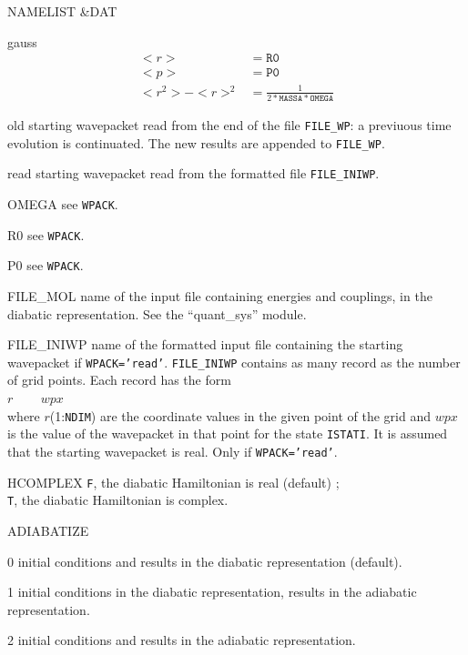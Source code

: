 \documentclass[12pt,fleqn]{article}
\begin{document}
\begin{labeling}{NAMELIST \&DAT}
\begin{labeling}{gauss}
\begin{align*}
                           <r> &= \mathtt{R0}   \\
                           <p> &= \mathtt{P0}   \\
                           <r^2> - <r>^2 &= \frac{1}{2 * \mathtt{MASSA} * \mathtt{OMEGA}}
                         \end{align*}
                       \item[old]  starting wavepacket read from the end of the file \texttt{FILE\_WP}: a previuous time
                         evolution is continuated. The new results are appended to \texttt{FILE\_WP}.
                       \item[read]  starting wavepacket read from the formatted file \texttt{FILE\_INIWP}.
                     \end{labeling}
  \item[OMEGA] see \texttt{WPACK}.
  \item[R0] see \texttt{WPACK}.
  \item[P0] see \texttt{WPACK}.
  \item[FILE\_MOL] name of the input file containing energies and couplings, in the diabatic representation.
    See the ``quant\_sys'' module.
  \item[FILE\_INIWP] name of the formatted input file containing the starting wavepacket if \texttt{WPACK='read'}. 
    \texttt{FILE\_INIWP} contains as many record as the number of grid points. Each
    record has the form \\
    $r$ ~~~ $wpx$ \\
    where $r$(1:\texttt{NDIM}) are the coordinate values in the given point of the grid and $wpx$ is the value of the
    wavepacket in that point for the state \texttt{ISTATI}. It is assumed that the starting wavepacket is real.
    Only if \texttt{WPACK='read'}.
  \item[HCOMPLEX] \texttt{F}, the diabatic Hamiltonian is real (default) ; \\
    \texttt{T}, the diabatic Hamiltonian is complex.
  \item[ADIABATIZE] \begin{labeling}{3}
                       \setlength{\itemsep}{-0.5ex}
                       \item[0] initial conditions and results in the diabatic representation (default).
                       \item[1] initial conditions in the diabatic representation, results in the adiabatic
                      representation. 
                       \item[2] initial conditions and results in the adiabatic representation.

\end{labeling}
\end{labeling}
\end{document}
